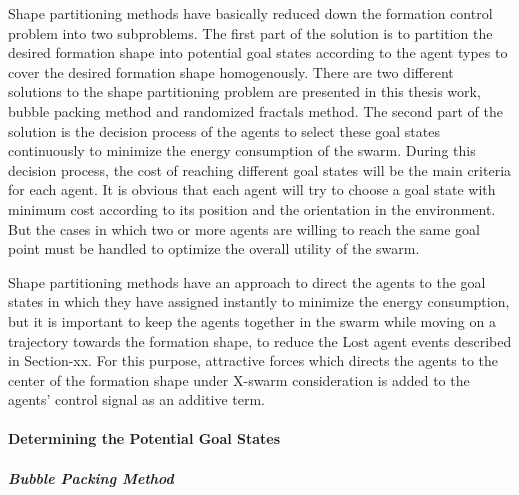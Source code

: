 \documentclass[twoside]{article}
\begin{document}
			Shape partitioning methods have basically reduced down the formation control problem into two subproblems. The first part of the solution is to partition the desired formation shape into potential goal states according to the agent types to cover the desired formation shape homogenously. There are two different solutions to the shape partitioning problem are presented in this thesis work, bubble packing method and randomized fractals method. The second part of the solution is the decision process of the agents to select these goal states continuously to minimize the energy consumption of the swarm. During this decision process, the cost of reaching different goal states will be the main criteria for each agent. It is obvious that each agent will try to choose a goal state with minimum cost according to its position and the orientation in the environment. But the cases in which two or more agents are willing to reach the same goal point must be handled to optimize the overall utility of the swarm. 


Shape partitioning methods have an approach to direct the agents to the goal states in which they have assigned instantly to minimize the energy consumption, but it is important to keep the agents together in the swarm while moving on a trajectory towards the formation shape, to reduce the Lost agent events described in Section-xx. For this purpose, attractive forces which directs the agents to the center of the formation shape under X-swarm consideration is added to the agents' control signal as an additive term. 
			
			\paragraph{Determining the Potential Goal States}
			\subparagraph{Bubble Packing Method} \hspace{0pt} \\	
			
\end{document}
